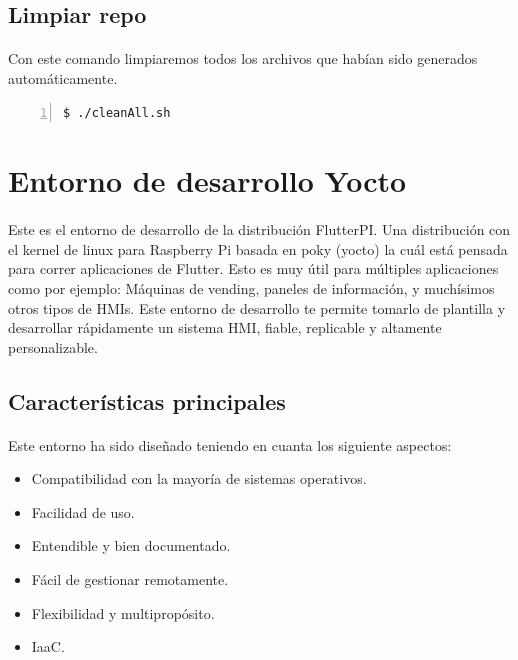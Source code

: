 \subsection{Limpiar repo}

\paragraph{}Con este comando limpiaremos todos los archivos que habían sido generados
automáticamente.

\begin{lstlisting}[style=consola, numbers=left]
    $ ./cleanAll.sh
\end{lstlisting}


\section{Entorno de desarrollo Yocto}

\paragraph{}Este es el entorno de desarrollo de la distribución FlutterPI. Una distribución
con el kernel de linux para Raspberry Pi basada en poky (yocto) la cuál está pensada
para correr aplicaciones de Flutter. Esto es muy útil para múltiples aplicaciones como
por ejemplo: Máquinas de vending, paneles de información, y muchísimos otros tipos de
HMIs. Este entorno de desarrollo te permite tomarlo de plantilla y desarrollar rápidamente
un sistema HMI, fiable, replicable y altamente personalizable.

\subsection{Características principales}

\paragraph{}Este entorno ha sido diseñado teniendo en cuanta los siguiente aspectos:

\begin{itemize}
    \item Compatibilidad con la mayoría de sistemas operativos.
    \item Facilidad de uso.
    \item Entendible y bien documentado.
    \item Fácil de gestionar remotamente.
    \item Flexibilidad y multipropósito.
    \item \gls{IaaC}.
\end{itemize}

